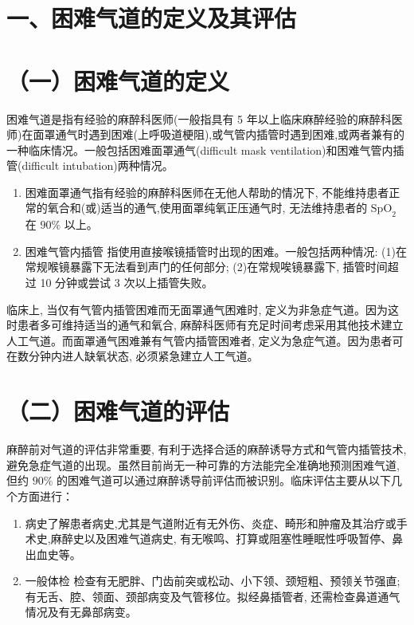 \documentclass[10pt]{article}
\begin{document}
\section*{一、困难气道的定义及其评估}
\section*{（一）困难气道的定义}
困难气道是指有经验的麻醉科医师(一般指具有 5 年以上临床麻醉经验的麻醉科医师)在面罩通气时遇到困难(上呼吸道梗阻),或气管内插管时遇到困难,或两者兼有的一种临床情况。一般包括困难面罩通气(difficult mask ventilation)和困难气管内插管(difficult intubation)两种情况。

\begin{enumerate}
  \item 困难面罩通气指有经验的麻醉科医师在无他人帮助的情况下, 不能维持患者正常的氧合和(或)适当的通气,使用面罩纯氧正压通气时, 无法维持患者的 $\mathrm{SpO}_{2}$ 在 $90 \%$ 以上。

  \item 困难气管内插管 指使用直接喉镜插管时出现的困难。一般包括两种情况: (1)在常规喉镜暴露下无法看到声门的任何部分; (2)在常规唉镜暴露下, 插管时间超过 10 分钟或尝试 3 次以上插管失败。

\end{enumerate}

临床上, 当仅有气管内插管困难而无面罩通气困难时, 定义为非急症气道。因为这时患者多可维持适当的通气和氧合, 麻醉科医师有充足时间考虑采用其他技术建立人工气道。而面罩通气困难兼有气管内插管困难者, 定义为急症气道。因为患者可在数分钟内进人缺氧状态, 必须紧急建立人工气道。

\section*{（二）困难气道的评估}
麻醉前对气道的评估非常重要, 有利于选择合适的麻醉诱导方式和气管内插管技术, 避免急症气道的出现。虽然目前尚无一种可靠的方法能完全准确地预测困难气道,但约 $90 \%$ 的困难气道可以通过麻醉诱导前评估而被识别。临床评估主要从以下几个方面进行：

\begin{enumerate}
  \item 病史了解患者病史,尤其是气道附近有无外伤、炎症、畸形和肿瘤及其治疗或手术史,麻醉史以及困难气道病史, 有无喉鸣、打算或阻塞性睡眠性呼吸暂停、鼻出血史等。

  \item 一般体检 检查有无肥胖、门齿前突或松动、小下领、颈短粗、预领关节强直; 有无舌、腔、领面、颈部病变及气管移位。拟经鼻插管者, 还需检查鼻道通气情况及有无鼻部病变。

\end{enumerate}
\end{document}
